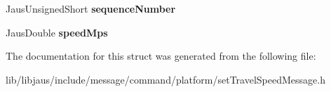 \begin{DoxyCompactItemize}
\item 
\hypertarget{struct_set_travel_speed_message_struct_a317dadc17e022a7e5f8676cb031b8981}{\-Jaus\-Unsigned\-Short {\bfseries sequence\-Number}}\label{struct_set_travel_speed_message_struct_a317dadc17e022a7e5f8676cb031b8981}

\item 
\hypertarget{struct_set_travel_speed_message_struct_a9c2406b85a34711c203d2fadcec082ad}{\-Jaus\-Double {\bfseries speed\-Mps}}\label{struct_set_travel_speed_message_struct_a9c2406b85a34711c203d2fadcec082ad}

\end{DoxyCompactItemize}


\-The documentation for this struct was generated from the following file\-:\begin{DoxyCompactItemize}
\item 
lib/libjaus/include/message/command/platform/set\-Travel\-Speed\-Message.\-h\end{DoxyCompactItemize}
